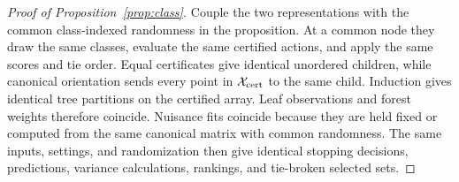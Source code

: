 \begin{appendix}
\begin{proof}[Proof of Proposition~\ref{prop:class}]
Couple the two representations with the common class-indexed randomness in the
proposition. At a common node they draw the same classes, evaluate the same
certified actions, and apply the same scores and tie order. Equal certificates
give identical unordered children, while canonical orientation sends every
point in \(\mathcal X_{\rm cert}\) to the same child. Induction gives identical
tree partitions on the certified array. Leaf observations and forest weights
therefore coincide. Nuisance fits coincide because they are held fixed or
computed from the same canonical matrix with common randomness. The same
inputs, settings, and randomization then give identical stopping decisions,
predictions, variance calculations, rankings, and tie-broken selected sets.
\end{proof}

\end{appendix}
